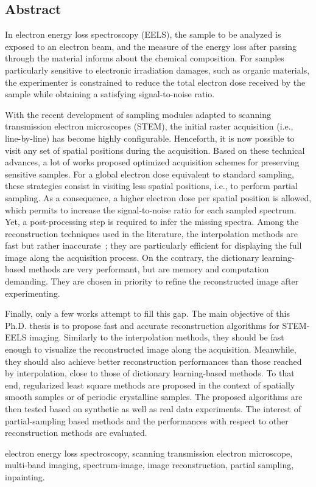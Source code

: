 \begin{fullwidth}

\chapter*{Abstract}
\label{ch:english_resume}

In electron energy loss spectroscopy (EELS), the sample to be analyzed is exposed to an electron beam, and the measure of the energy loss after passing through the material informs about the chemical composition. For samples particularly sensitive to electronic irradiation damages, such as organic materials, the experimenter is constrained to reduce the total electron dose received by the sample while obtaining a satisfying signal-to-noise ratio.

With the recent development of sampling modules adapted to scanning transmission electron microscopes (STEM), the initial raster acquisition (i.e., line-by-line) has become highly configurable. Henceforth, it is now possible to visit any set of spatial positions during the acquisition. Based on these technical advances, a lot of works proposed optimized acquisition schemes for preserving sensitive samples. For a global electron dose equivalent to standard sampling, these strategies consist in visiting less spatial positions, i.e., to perform partial sampling. As a consequence, a higher electron dose per spatial position is allowed, which permits to increase the signal-to-noise ratio for each sampled spectrum. Yet, a post-processing step is required to infer the missing spectra. Among the reconstruction techniques used in the literature, the interpolation methods are fast but rather inaccurate~; they are particularly efficient for displaying the full image along the acquisition process. On the contrary, the dictionary learning-based methods are very performant, but are memory and computation demanding. They are chosen in priority to refine the reconstructed image after experimenting.

Finally, only a few works attempt to fill this gap. The main objective of this Ph.D. thesis is to propose fast and accurate reconstruction algorithms for STEM-EELS imaging. Similarly to the interpolation methods, they should be fast enough to visualize the reconstructed image along the acquisition. Meanwhile, they should also achieve better reconstruction performances than those reached by interpolation, close to those of dictionary learning-based methods. To that end, regularized least square methods are proposed in the context of spatially smooth samples or of periodic crystalline samples. The proposed algorithms are then tested based on synthetic as well as real data experiments. The interest of partial-sampling based methods and the performances with respect to other reconstruction methods are evaluated.


\vspace{1em}
%
electron energy loss spectroscopy, 
scanning transmission electron microscope, 
multi-band imaging, 
spectrum-image,
image reconstruction, 
partial sampling,
inpainting.

\end{fullwidth}